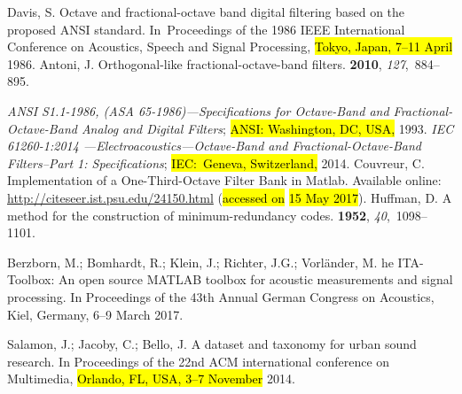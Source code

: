 \documentclass[sensors,article,accept,moreauthors,pdftex,10pt,a4paper]{mdpi}
\DeclareRobustCommand{\fg}[1]{{\sethlcolor{cyan}\hl{#1}}}
\begin{document}
\begin{thebibliography}{999}
Davis, S.
\newblock Octave and fractional-octave band digital filtering based on the
  proposed ANSI standard.
\newblock  In~Proceedings of the 1986 IEEE International Conference on Acoustics, Speech and Signal
  Processing, \hl{Tokyo, Japan, 7--11 April } 1986.
Antoni, J.
\newblock Orthogonal-like fractional-octave-band filters.
 {\bf 2010}, {\em 127},~884--895.

\emph{ANSI S1.1-1986, (ASA 65-1986)---Specifications for Octave-Band and
  Fractional-Octave-Band Analog and Digital Filters}; \hl{ANSI: Washington, DC, USA,}  1993.
\emph{IEC 61260-1:2014 ---Electroacoustics---Octave-Band and Fractional-Octave-Band
  Filters--Part 1: Specifications}; \hl{IEC:~Geneva, Switzerland, }2014.
Couvreur, C.
\newblock Implementation of a One-Third-Octave Filter Bank in Matlab.
\newblock Available online: \mbox{\url{http://citeseer.ist.psu.edu/24150.html}} (\hl{accessed on} \fg{15 May 2017}).
Huffman, D.
\newblock A method for the construction of minimum-redundancy codes.
 {\bf 1952}, {\em 40},~1098--1101.

Berzborn, M.; Bomhardt, R.; Klein, J.; Richter, J.G.; Vorländer, M.
he {ITA}-{T}oolbox: {A}n {o}pen {s}ource {MATLAB} {t}oolbox for
  {a}coustic {m}easurements and {s}ignal {p}rocessing.
\newblock In Proceedings of the 43th Annual German Congress on Acoustics, Kiel, Germany, 6--9 March 2017.

Salamon, J.; Jacoby, C.; Bello, J.
\newblock A dataset and taxonomy for urban sound research.
\newblock In Proceedings of the 22nd ACM international conference on Multimedia, \hl{Orlando, FL, USA, 3--7 November }2014.


\end{thebibliography}
\end{document}
